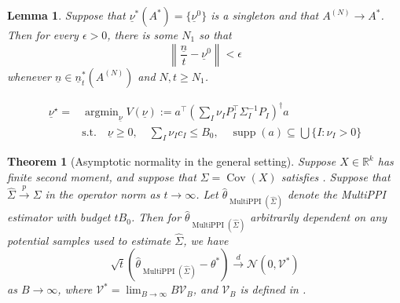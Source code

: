 \documentclass[10pt,a4paper]{amsart}
\newtheorem{lemma}{Lemma}
\newtheorem{theorem}{Theorem}
\DeclareMathOperator{\Cov}{Cov}
\newcommand{\R}{\mathbb{R}}
\DeclareMathOperator{\argmin}{argmin}
\DeclareMathOperator{\multiPPI}{MultiPPI}
\DeclareMathOperator{\supp}{supp}
\newcommand{\ul}[1]{\underline{#1}}
\newcommand{\wh}[1]{\widehat{#1}}
\begin{document}
\begin{lemma}\label{lemma:discrete-convergence}
    Suppose that $\ul{\nu}^*(A^*)=\{\ul{{\nu}}^0\}$ is a singleton and that $A^{(N)}\to A^*$. Then for every $\epsilon>0$, there is some $N_1$ so that
    \[
    \left\| \frac{\ul{n}}{t}-\ul{\nu}^0 \right\| <\epsilon
    \]
    whenever $\ul{n}\in\ul{n}^*_t(A^{(N)})$ and $N,t\geq N_1$. 
\end{lemma}

\begin{equation}\label{eqn:condition}
\begin{split}
    \ul{\nu}^\star = &\argmin_{\ul{\nu}} V(\ul{\nu}) :=a^\top\left(\sum_I \nu_I P_I^\top \Sigma_I^{-1} P_I\right)^\dagger a \\
    & \text{s.t.}\quad \ul{\nu}\geq0,\quad \sum_I \nu_I c_I\leq B_0,\quad \supp(a)\subseteq\bigcup \{I:\nu_I>0\}
\end{split}
\end{equation}

\begin{theorem}[Asymptotic normality in the general setting]\label{thm:asymptotic2} Suppose $X\in\R^k$ has finite second moment, and suppose that $\Sigma=\Cov(X)$ satisfies . Suppose that $\wh{\Sigma}\overset{p}{\to}\Sigma$ in the operator norm as $t\to\infty$. Let $\hat{\theta}_{\multiPPI(\widehat{\Sigma})}$ denote the MultiPPI estimator with budget $tB_0$. Then for $\hat{\theta}_{\multiPPI(\widehat{\Sigma})}$ arbitrarily dependent on any potential samples used to estimate $\widehat{\Sigma}$, we have
    \[
    \sqrt{t}\left(\hat{\theta}_{\multiPPI(\widehat{\Sigma})}-\theta^*\right)\overset{d}{\to}\mathcal{N}(0,\mathcal{V}^*)
    \]
    as $B\to\infty$, where $\mathcal{V}^*=\lim_{B\to\infty} B\mathcal{V}_{B}$, and $\mathcal{V}_{B}$ is defined in .
\end{theorem}
\end{document}
